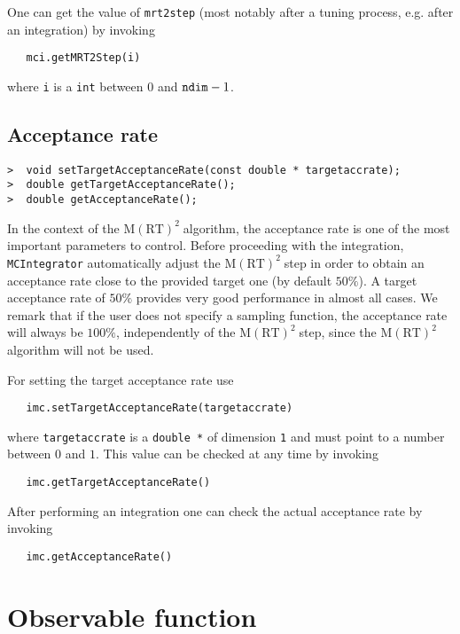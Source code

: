 \documentclass[11pt,a4paper,twoside]{article}
\newcommand{\MRTWO}{$ \text{M}(\text{RT})^2 \;$}
\begin{document}
One can get the value of \verb+mrt2step+ (most notably after a tuning process, e.g. after an integration) by invoking
\begin{verbatim}
   mci.getMRT2Step(i)
\end{verbatim}
where \verb+i+ is a \verb+int+ between $0$ and $\verb+ndim+-1$.



\subsection{Acceptance rate} %
\label{sub:acceptance_rate}

\begin{verbatim}
>  void setTargetAcceptanceRate(const double * targetaccrate);
>  double getTargetAcceptanceRate();
>  double getAcceptanceRate();
\end{verbatim}

In the context of the \MRTWO algorithm, the acceptance rate is one of the most important parameters to control.
Before proceeding with the integration, \verb+MCIntegrator+ automatically adjust the \MRTWO step in order to obtain an acceptance rate close to the provided target one (by default $50\%$).
A target acceptance rate of $50\%$ provides very good performance in almost all cases.
We remark that if the user does not specify a sampling function, the acceptance rate will always be $100\%$, independently of the \MRTWO step, since the \MRTWO algorithm will not be used.

For setting the target acceptance rate use
\begin{verbatim}
   imc.setTargetAcceptanceRate(targetaccrate)
\end{verbatim}
where \verb+targetaccrate+ is a \verb+double *+ of dimension \verb+1+ and must point to a number between $0$ and $1$.
This value can be checked at any time by invoking
\begin{verbatim}
   imc.getTargetAcceptanceRate()
\end{verbatim}

After performing an integration one can check the actual acceptance rate by invoking
\begin{verbatim}
   imc.getAcceptanceRate()
\end{verbatim}


\section{Observable function} %
\label{sec:observable_function}
\end{document}
